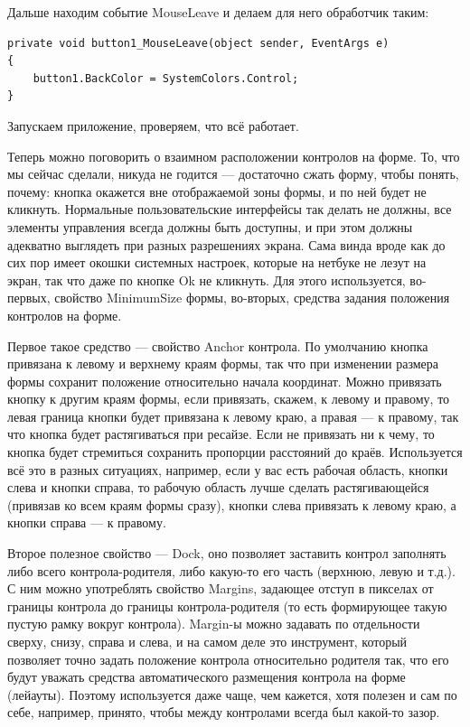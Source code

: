 \documentclass{../../text-style}
\begin{document}
Дальше находим событие MouseLeave и делаем для него обработчик таким:

\begin{verbatim}
private void button1_MouseLeave(object sender, EventArgs e)
{
    button1.BackColor = SystemColors.Control;
}
\end{verbatim}

Запускаем приложение, проверяем, что всё работает.

Теперь можно поговорить о взаимном расположении контролов на форме. То, что мы сейчас сделали, никуда не годится --- достаточно сжать форму, чтобы понять, почему: кнопка окажется вне отображаемой зоны формы, и по ней будет не кликнуть. Нормальные пользовательские интерфейсы так делать не должны, все элементы управления всегда должны быть доступны, и при этом должны адекватно выглядеть при разных разрешениях экрана. Сама винда вроде как до сих пор имеет окошки системных настроек, которые на нетбуке не лезут на экран, так что даже по кнопке Ok не кликнуть. Для этого используется, во-первых, свойство MinimumSize формы, во-вторых, средства задания положения контролов на форме. 

Первое такое средство --- свойство Anchor контрола. По умолчанию кнопка привязана к левому и верхнему краям формы, так что при изменении размера формы сохранит положение относительно начала координат. Можно привязать кнопку к другим краям формы, если привязать, скажем, к левому и правому, то левая граница кнопки будет привязана к левому краю, а правая --- к правому, так что кнопка будет растягиваться при ресайзе. Если не привязать ни к чему, то кнопка будет стремиться сохранить пропорции расстояний до краёв. Используется всё это в разных ситуациях, например, если у вас есть рабочая область, кнопки слева и кнопки справа, то рабочую область лучше сделать растягивающейся (привязав ко всем краям формы сразу), кнопки слева привязать к левому краю, а кнопки справа --- к правому.

Второе полезное свойство --- Dock, оно позволяет заставить контрол заполнять либо всего контрола-родителя, либо какую-то его часть (верхнюю, левую и т.д.). С ним можно употреблять свойство Margins, задающее отступ в пикселах от границы контрола до границы контрола-родителя (то есть формирующее такую пустую рамку вокруг контрола). Margin-ы можно задавать по отдельности сверху, снизу, справа и слева, и на самом деле это инструмент, который позволяет точно задать положение контрола относительно родителя так, что его будут уважать средства автоматического размещения контрола на форме (лейауты). Поэтому используется даже чаще, чем кажется, хотя полезен и сам по себе, например, принято, чтобы между контролами всегда был какой-то зазор.
\end{document}
